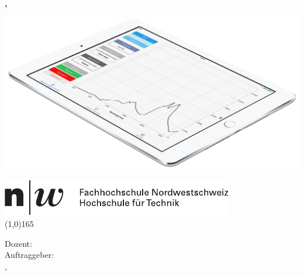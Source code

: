 \thispagestyle{plain}

\begin{titlepage}
	\begin{center}
		\vspace*{1cm}
		\textbf{
			\hspace{-0.12cm}\LARGE{\doctype}\\
			\Huge{\titel}\\
			\vspace{0.5cm}
			\large{\untertitel}\\
			\vspace{1.5cm}
			\large{\autorA, \autorB}\\
		}
		
		\begin{center}
		\vspace*{0.5cm}
		\includegraphics[scale=0.3]{images/ipadAir_Spektrometer}
		\end{center}
		
		\vfill
		\large{
			\hspace{-0.83cm} \includegraphics{images/fhnw_logo}\\
			\line(1,0){165}	

			\vspace{0.5cm}
			Dozent: \dozent \\
			\vspace{0.1cm}
			Auftraggeber:  \auftraggeber \\
			\vspace{0.5cm}
			\ort, \datum
		}
	\end{center}
\end{titlepage}